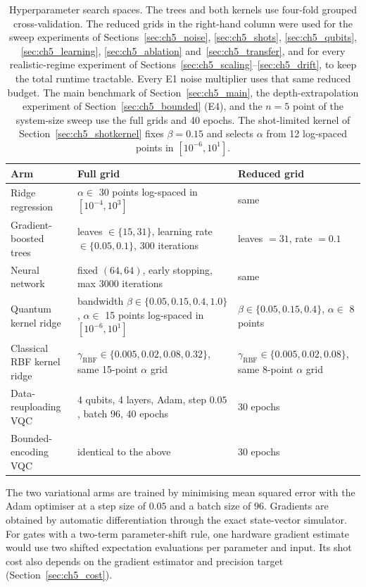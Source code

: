 \documentclass[Thesis.tex]{subfiles}
\begin{document}
\begin{table}[htbp]
\centering
\caption[Hyperparameter search spaces]{Hyperparameter search spaces. The trees and both kernels use four-fold
grouped cross-validation. The reduced grids in the right-hand column
were used for the sweep experiments of Sections~\ref{sec:ch5_noise},
\ref{sec:ch5_shots}, \ref{sec:ch5_qubits}, \ref{sec:ch5_learning},
\ref{sec:ch5_ablation} and~\ref{sec:ch5_transfer}, and for every realistic-regime
experiment of Sections~\ref{sec:ch5_scaling}--\ref{sec:ch5_drift}, to keep the total
runtime tractable. Every E1 noise multiplier uses that same reduced budget.
The main benchmark of Section~\ref{sec:ch5_main}, the
depth-extrapolation experiment of Section~\ref{sec:ch5_bounded} (E4), and the $n=5$ point of the system-size sweep
use the full grids and 40 epochs. The shot-limited kernel of
Section~\ref{sec:ch5_shotkernel} fixes $\beta = 0.15$ and selects $\alpha$ from 12
log-spaced points in $[10^{-6}, 10^{1}]$.}
\label{tab:ch4_grids}
\small
\begin{tabular}{p{3.4cm} p{5.3cm} p{3.6cm}}
\toprule
\textbf{Arm} & \textbf{Full grid} & \textbf{Reduced grid} \\
\midrule
Ridge regression &
$\alpha \in$ 30 points log-spaced in $[10^{-4}, 10^{3}]$ &
same \\
\addlinespace
Gradient-boosted trees &
leaves $\in \{15, 31\}$, learning rate $\in \{0.05, 0.1\}$, 300 iterations &
leaves $= 31$, rate $= 0.1$ \\
\addlinespace
Neural network &
fixed $(64, 64)$, early stopping, max 3000 iterations &
same \\
\addlinespace
Quantum kernel ridge &
bandwidth $\beta \in \{0.05, 0.15, 0.4, 1.0\}$, $\alpha \in$ 15 points
log-spaced in $[10^{-6}, 10^{1}]$ &
$\beta \in \{0.05, 0.15, 0.4\}$, $\alpha \in$ 8 points \\
\addlinespace
Classical RBF kernel ridge &
$\gamma_{\mathrm{RBF}} \in \{0.005, 0.02, 0.08, 0.32\}$, same 15-point $\alpha$ grid &
$\gamma_{\mathrm{RBF}} \in \{0.005, 0.02, 0.08\}$, same 8-point $\alpha$ grid \\
\addlinespace
Data-reuploading VQC &
4 qubits, 4 layers, Adam, step $0.05$, batch $96$, 40 epochs &
30 epochs \\
\addlinespace
Bounded-encoding VQC &
identical to the above &
30 epochs \\
\bottomrule
\end{tabular}
\end{table}

The two variational arms are trained by minimising mean squared error with the Adam
optimiser at a step size of $0.05$ and a batch size of $96$. Gradients are obtained
by automatic differentiation through the exact state-vector simulator.
For gates with a two-term parameter-shift rule, one hardware gradient estimate
would use two shifted expectation evaluations per parameter and input. Its
shot cost also depends on the gradient estimator and precision target
(Section~\ref{sec:ch5_cost}).
\end{document}
